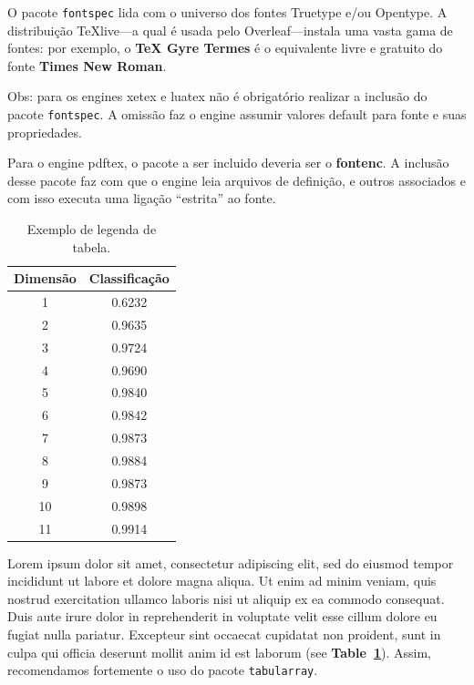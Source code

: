 \documentclass[portuguese]{sbc2025}%
\begin{document}
O pacote \texttt{fontspec} lida com o universo dos fontes Truetype e/ou Opentype. 
A distribuição TeXlive---a qual é usada pelo Overleaf---instala uma vasta gama de fontes: por exemplo, o \textbf{TeX Gyre Termes} é o equivalente livre e gratuito do fonte \textbf{Times New Roman}. 

Obs: para os engines xetex e luatex não é obrigatório realizar a inclusão do pacote \texttt{fontspec}. A omissão faz o engine assumir valores default para fonte e suas propriedades.

Para o engine pdftex, o pacote a ser incluido deveria ser o \textbf{fontenc}. 
A inclusão desse pacote faz com que o engine leia arquivos de definição, e outros associados e com isso executa uma ligação ``estrita'' ao fonte.  

\begin{table}[!ht]
\caption{Exemplo de legenda de tabela.}
\centering
\begin{tabular}{@{}cc@{}}
\hline\hline
Dimensão & Classificação\\
\hline%
 1  & 0.6232 \\
 2  & 0.9635 \\ 
 3  & 0.9724 \\ 
 4  & 0.9690 \\ 
 5  & 0.9840 \\ 
 6  & 0.9842 \\ 
 7  & 0.9873 \\ 
 8  & 0.9884 \\
 9  & 0.9873 \\ 
 10 & 0.9898 \\ 
 11 & 0.9914 \\
\hline\hline
\end{tabular}
\label{tab1}
\end{table}

Lorem ipsum dolor sit amet, consectetur adipiscing elit, sed do eiusmod tempor incididunt ut labore et dolore magna aliqua. Ut enim ad minim veniam, quis nostrud exercitation ullamco laboris nisi ut aliquip ex ea commodo consequat. Duis aute irure dolor in reprehenderit in voluptate velit esse cillum dolore eu fugiat nulla pariatur. Excepteur sint occaecat cupidatat non proident, sunt in culpa qui officia deserunt mollit anim id est laborum (see \textbf{ Table~\ref{tab1}}). 
Assim, recomendamos fortemente o uso do pacote \texttt{tabularray}. 
\end{document}
